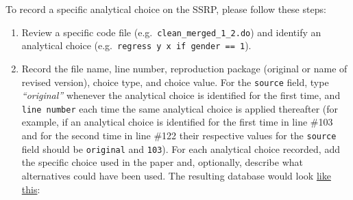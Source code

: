 \documentclass[
]{book}
\begin{document}
To record a specific analytical choice on the SSRP, please follow these steps:

\begin{enumerate}
\def\labelenumi{\arabic{enumi}.}
\item
  Review a specific code file (e.g.~\texttt{clean\_merged\_1\_2.do}) and identify an analytical choice (e.g.~\texttt{regress\ y\ x\ if\ gender\ ==\ 1}).
\item
  Record the file name, line number, reproduction package (original or name of revised version), choice type, and choice value. For the \texttt{source} field, type \emph{``original''} whenever the analytical choice is identified for the first time, and \texttt{line\ number} each time the same analytical choice is applied thereafter (for example, if an analytical choice is identified for the first time in line \#103 and for the second time in line \#122 their respective values for the \texttt{source} field should be \texttt{original} and \texttt{103}). For each analytical choice recorded, add the specific choice used in the paper and, optionally, describe what alternatives could have been used. The resulting database would look \href{https://docs.google.com/spreadsheets/d/1nZuJSHswbZgaaIfBcyIUGPwG-WIP8zE1Oambud-WoDc/edit?usp=sharing}{like this}:
\end{enumerate}
\end{document}
